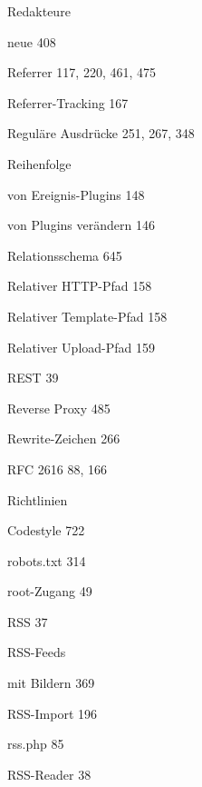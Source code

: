 \documentclass{book}
\renewcommand\subitem{\par}
\begin{document}
\begin{multicols}{2}
\begin{osp-index}
  \item Redakteure
    \subitem neue\hspace{1mm} 408
  \item Referrer\hspace{1mm} 117, 220, 461, 475
  \item Referrer-Tracking\hspace{1mm} 167
  \item Regul\"are Ausdr\"ucke\hspace{1mm} 251, 267, 348
  \item Reihenfolge
    \subitem von Ereignis-Plugins\hspace{1mm} 148
    \subitem von Plugins ver\"andern\hspace{1mm} 146
  \item Relationsschema\hspace{1mm} 645
  \item Relativer HTTP-Pfad\hspace{1mm} 158
  \item Relativer Template-Pfad\hspace{1mm} 158
  \item Relativer Upload-Pfad\hspace{1mm} 159
  \item REST\hspace{1mm} 39
  \item Reverse Proxy\hspace{1mm} 485
  \item Rewrite-Zeichen\hspace{1mm} 266
  \item RFC 2616\hspace{1mm} 88, 166
  \item Richtlinien
    \subitem Codestyle\hspace{1mm} 722
  \item robots.txt\hspace{1mm} 314
  \item root-Zugang\hspace{1mm} 49
  \item RSS\hspace{1mm} 37
  \item RSS-Feeds\hspace{1mm} 
    \subitem mit Bildern\hspace{1mm} 369
  \item RSS-Import\hspace{1mm} 196
  \item rss.php\hspace{1mm} 85
  \item RSS-Reader\hspace{1mm} 38


\end{osp-index}
\end{multicols}
\end{document}

